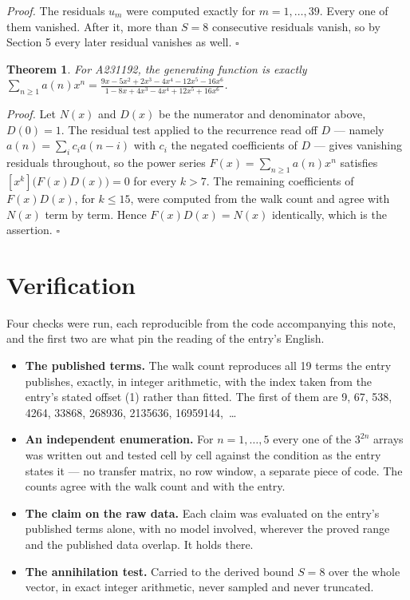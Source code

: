 \documentclass[11pt]{article}
\newtheorem{theorem}{Theorem}
\theoremstyle{definition}
\begin{document}
{\itshape Proof.} The residuals $u_m$ were computed exactly for $m = 1,\dots,39$. Every one of them vanished. After it, more than $S = 8$ consecutive residuals vanish, so by Section 5 every later residual vanishes as well. $\square$

\begin{theorem} For A231192, the generating function is exactly $\sum_{n\ge 1} a(n)x^n = \frac{9x - 5x^{2} + 2x^{3} - 4x^{4} - 12x^{5} - 16x^{6}}{1 - 8x + 4x^{3} - 4x^{4} + 12x^{5} + 16x^{6}}$.\end{theorem}

{\itshape Proof.} Let $N(x)$ and $D(x)$ be the numerator and denominator above, $D(0)=1$. The residual test applied to the recurrence read off $D$ --- namely $a(n) = \sum_i c_i a(n-i)$ with $c_i$ the negated coefficients of $D$ --- gives vanishing residuals throughout, so the power series $F(x)=\sum_{n\ge 1}a(n)x^n$ satisfies $[x^k]\bigl(F(x)D(x)\bigr) = 0$ for every $k > 7$. The remaining coefficients of $F(x)D(x)$, for $k \le 15$, were computed from the walk count and agree with $N(x)$ term by term. Hence $F(x)D(x) = N(x)$ identically, which is the assertion. $\square$

\section{Verification}

Four checks were run, each reproducible from the code accompanying this note, and the first two are what pin the reading of the entry's English.

\begin{itemize}

\item {\bfseries The published terms.} The walk count reproduces all 19 terms the entry publishes, exactly, in integer arithmetic, with the index taken from the entry's stated offset (1) rather than fitted. The first of them are 9, 67, 538, 4264, 33868, 268936, 2135636, 16959144,~\dots

\item {\bfseries An independent enumeration.} For $n = 1,\dots,5$ every one of the $3^{2n}$ arrays was written out and tested cell by cell against the condition as the entry states it --- no transfer matrix, no row window, a separate piece of code. The counts agree with the walk count and with the entry.

\item {\bfseries The claim on the raw data.} Each claim was evaluated on the entry's published terms alone, with no model involved, wherever the proved range and the published data overlap. It holds there.

\item {\bfseries The annihilation test.} Carried to the derived bound $S = 8$ over the whole vector, in exact integer arithmetic, never sampled and never truncated.

\end{itemize}
\end{document}
